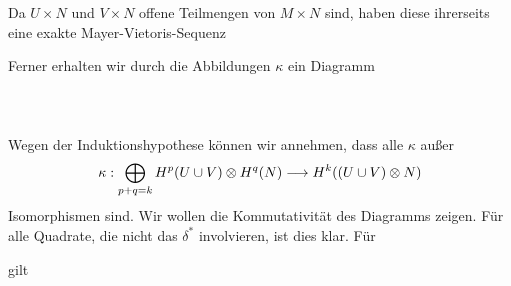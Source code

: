 \begin{Beweis}{}
\begin{tiny}
\begin{center}
\end{center}
\end{tiny}
Da $U\times N$ und $V\times N$ offene Teilmengen von $M\times N$ sind, haben diese ihrerseits eine exakte Mayer-Vietoris-Sequenz
\begin{center}
\begin{small}
\end{small}
\end{center}
Ferner erhalten wir durch die Abbildungen $\kappa$ ein Diagramm\\\\
\\\\
Wegen der Induktionshypothese können wir annehmen, dass alle $\kappa$ außer
\[ \kappa : \bigoplus\limits_{p+q = k}H^p(U\cup V)\otimes H^q(N) \overset{}{\longrightarrow} H^k((U\cup V) \otimes N) \]
Isomorphismen sind. Wir wollen die Kommutativität des Diagramms zeigen. Für alle Quadrate, die nicht das $\delta^*$ involvieren, ist dies klar. Für
\begin{center}
\end{center}
gilt
\begin{align*}

\end{align*}
\end{Beweis}
